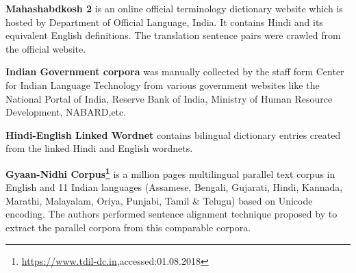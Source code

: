 \textbf{Mahashabdkosh 2} is an online official terminology dictionary website which is hosted by Department of Official Language, India. It contains Hindi and its equivalent English definitions. The translation sentence pairs were crawled from the official website.

\textbf{Indian Government corpora} was manually collected by the staff form Center for Indian Language Technology from various government websites like the National Portal of India, Reserve Bank of India, Ministry of Human Resource Development, NABARD,etc.

\textbf{Hindi-English Linked Wordnet} contains bilingual dictionary entries created from the linked Hindi and English wordnets.

\textbf{Gyaan-Nidhi Corpus\footnote{\url{https://www.tdil-dc.in},accessed:01.08.2018}} is a million pages multilingual parallel text corpus in English and 11 Indian languages (Assamese, Bengali, Gujarati, Hindi, Kannada, Marathi, Malayalam, Oriya, Punjabi, Tamil \& Telugu) based on Unicode encoding. The authors performed sentence alignment technique proposed by \cite{Moore:2002:FAS:648181.749407} to extract the parallel corpora from this comparable corpora. 

